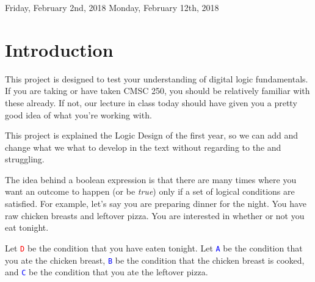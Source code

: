 \documentclass{article}
\begin{document}
\newcommand{\mysubsection}[1]{
    {\fontsize{13}{15}\selectfont\bf \item #1}}
    
\newenvironment{subenv}[1]
{\section{#1}\vspace{.5em}\begin{enumerate}}
{\end{enumerate}}

\newcommand{\varin}[1]{\textcolor{blue}{\texttt{#1}}}
\newcommand{\varout}[1]{\textcolor{red}{\texttt{#1}}}



\large

            {Friday, February 2nd, 2018}
            {Monday, February 12th, 2018}

\section{Introduction}
    \par This project is designed to test your understanding of digital logic fundamentals.  If you are taking or have taken CMSC 250, you should be relatively familiar with these already.  If not, our lecture in class today should have given you a pretty good idea of what you're working with.
    \par This project is explained the Logic Design of the first year, so we can add and change what we what to develop in the text without regarding to the and struggling.
    
    \par The idea behind a boolean expression is that there are many times where you want an outcome to happen (or be \emph{true}) only if a set of logical conditions are satisfied.  For example, let's say you are preparing dinner for the night.  You have raw chicken breasts and leftover pizza.  You are interested in whether or not you eat tonight.  
    
    \par Let \varout{D} be the condition that you have eaten tonight.  Let \varin{A} be the condition that you ate the chicken breast, \varin{B} be the condition that the chicken breast is cooked, and \varin{C} be the condition that you ate the leftover pizza.
    
\end{document}
